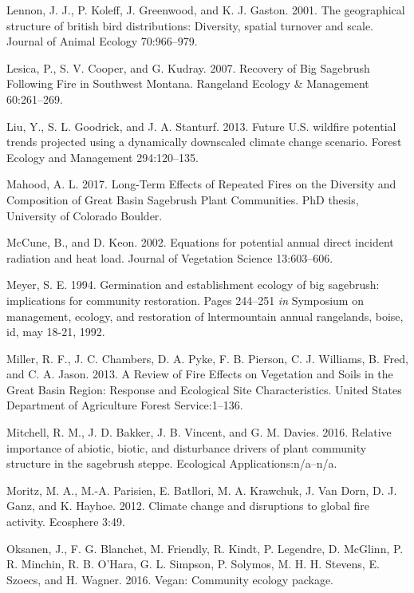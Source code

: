 \documentclass[12pt,]{article}
\begin{document}
\hypertarget{ref-Lennon2001}{}
Lennon, J. J., P. Koleff, J. Greenwood, and K. J. Gaston. 2001. The
geographical structure of british bird distributions: Diversity, spatial
turnover and scale. Journal of Animal Ecology 70:966--979.

\hypertarget{ref-Lesica2007}{}
Lesica, P., S. V. Cooper, and G. Kudray. 2007. Recovery of Big Sagebrush
Following Fire in Southwest Montana. Rangeland Ecology \& Management
60:261--269.

\hypertarget{ref-Liu2013}{}
Liu, Y., S. L. Goodrick, and J. A. Stanturf. 2013. Future U.S. wildfire
potential trends projected using a dynamically downscaled climate change
scenario. Forest Ecology and Management 294:120--135.

\hypertarget{ref-Mahood2017}{}
Mahood, A. L. 2017. Long-Term Effects of Repeated Fires on the Diversity
and Composition of Great Basin Sagebrush Plant Communities. PhD thesis,
University of Colorado Boulder.

\hypertarget{ref-McCune2002}{}
McCune, B., and D. Keon. 2002. Equations for potential annual direct
incident radiation and heat load. Journal of Vegetation Science
13:603--606.

\hypertarget{ref-Meyer1994}{}
Meyer, S. E. 1994. Germination and establishment ecology of big
sagebrush: implications for community restoration. Pages 244--251
\emph{in} Symposium on management, ecology, and restoration of
lntermountain annual rangelands, boise, id, may 18-21, 1992.

\hypertarget{ref-Miller2013}{}
Miller, R. F., J. C. Chambers, D. A. Pyke, F. B. Pierson, C. J.
Williams, B. Fred, and C. A. Jason. 2013. A Review of Fire Effects on
Vegetation and Soils in the Great Basin Region: Response and Ecological
Site Characteristics. United States Department of Agriculture Forest
Service:1--136.

\hypertarget{ref-Mitchell2016}{}
Mitchell, R. M., J. D. Bakker, J. B. Vincent, and G. M. Davies. 2016.
Relative importance of abiotic, biotic, and disturbance drivers of plant
community structure in the sagebrush steppe. Ecological
Applications:n/a--n/a.

\hypertarget{ref-Moritz2012a}{}
Moritz, M. A., M.-A. Parisien, E. Batllori, M. A. Krawchuk, J. Van Dorn,
D. J. Ganz, and K. Hayhoe. 2012. Climate change and disruptions to
global fire activity. Ecosphere 3:49.

\hypertarget{ref-Vegan2016}{}
Oksanen, J., F. G. Blanchet, M. Friendly, R. Kindt, P. Legendre, D.
McGlinn, P. R. Minchin, R. B. O'Hara, G. L. Simpson, P. Solymos, M. H.
H. Stevens, E. Szoecs, and H. Wagner. 2016. Vegan: Community ecology
package.
\end{document}
